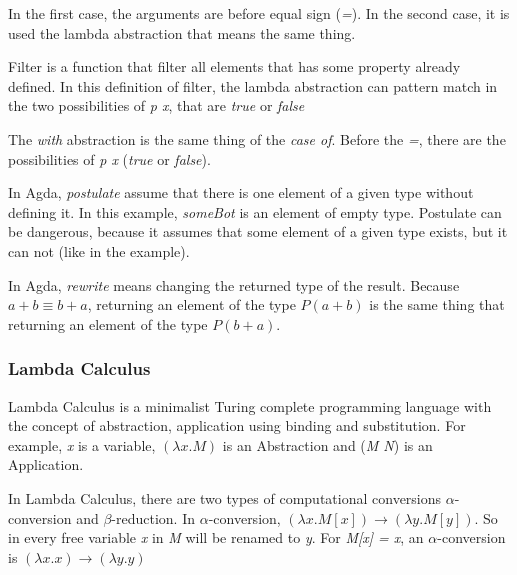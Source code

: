 
  In the first case, the arguments are before equal sign (\emph{=}).
  In the second case, it is used the lambda abstraction that means the same thing.



  Filter is a function that filter all elements that has some property already defined.
  In this definition of filter, the lambda abstraction can pattern match
  in the two possibilities of \emph{p x}, that are \emph{true} or \emph{false}


  The \emph{with} abstraction is the same thing of the \emph{case of}.
  Before the \emph{=}, there are the possibilities of \emph{p x} (\emph{true} or \emph{false}).


  In Agda, \emph{postulate} assume that there is one element of a given type without defining it.
  In this example, \emph{someBot} is an element of empty type.
  Postulate can be dangerous, because it assumes that some element of a given type exists,
  but it can not (like in the example).


  In Agda, \emph{rewrite} means changing the returned type of the result.
  Because $a + b ≡ b + a$, returning an element of the type $P (a + b)$ is the
  same thing that returning an element of the type $P (b + a)$.

  \subsubsection{Lambda Calculus}
  Lambda Calculus is a minimalist Turing complete programming language with the concept of abstraction,
  application using binding and substitution. For example, \emph{x} is a variable, $(\lambda x.M)$
  is an Abstraction and (\emph{M N}) is an Application.

  In Lambda Calculus, there are two types of computational conversions $\alpha$-conversion
  and $\beta$-reduction.
  In $\alpha$-conversion, $(\lambda x.M[x]) \rightarrow (\lambda y.M[y])$.
  So in every free variable \emph{x} in \emph{M} will be renamed to \emph{y}.
  For \emph{M[x] = x}, an $\alpha$-conversion is $(\lambda x.x) \rightarrow (\lambda y.y)$

